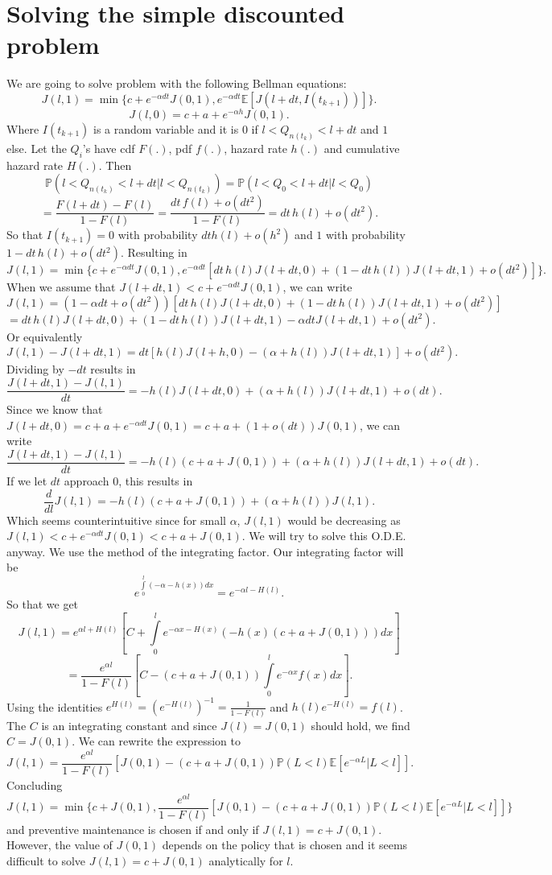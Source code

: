 

\section{Solving the simple discounted problem}
We are going to solve problem with the following Bellman equations:
$$
J(l,1)=\min\{
c+e^{-\alpha dt} J(0,1),
e^{-\alpha dt} \mathbb{E}[J(l+dt,I(t_{k+1}))]
\}.
$$
$$
J(l,0)=c + a + e^{-\alpha h} J(0,1).
$$
Where $I(t_{k+1})$ is a random variable and it is $0$ if $l<Q_{n(t_k)}<l+dt$ and $1$ else. Let the $Q_i$'s have cdf $F(.)$, pdf $f(.)$, hazard rate $h(.)$ and cumulative hazard rate $H(.)$. Then
$$
\mathbb{P}(l<Q_{n(t_k)}<l+dt|l<Q_{n(t_k)})=\mathbb{P}(l<Q_0<l+dt|l<Q_0)
$$
$$
=\frac{F(l+dt)-F(l)}{1-F(l)}=\frac{dt\,f(l)+o(dt^2)}{1-F(l)}=dt\,h(l)+o(dt^2).
$$
So that $I(t_{k+1})=0$ with probability $dth(l)+o(h^2)$ and $1$ with probability $1-dt\,h(l)+o(dt^2)$. Resulting in
$$
J(l,1)=\min\{
c+e^{-\alpha dt} J(0,1), 
e^{-\alpha dt} [dt\,h(l)J(l+dt,0) + (1-dt\,h(l))J(l+dt,1) +o(dt^2)]
\}.
$$
When we assume that $J(l+dt,1)<c+e^{-\alpha dt} J(0,1)$, we can write
$$
J(l,1)=
(1-\alpha dt +o(dt^2)) [dt\,h(l)J(l+dt,0) + (1-dt\,h(l))J(l+dt,1) +o(dt^2)]
$$
$$
=dt\,h(l)J(l+dt,0) + (1-dt\,h(l))J(l+dt,1) - \alpha dt J(l+dt,1) +o(dt^2)
.
$$
Or equivalently
$$
J(l,1)-J(l+dt,1)=
dt[h(l)J(l+h,0) - (\alpha +h(l))J(l+dt,1)] +o(dt^2)
.
$$
Dividing by $-dt$ results in
$$
\frac{J(l+dt,1)-J(l,1)}{dt}=
-h(l)J(l+dt,0) + (\alpha +h(l))J(l+dt,1) +o(dt)
.
$$
Since we know that $J(l+dt,0)=c + a + e^{-\alpha dt} J(0,1)=c+a+(1+o(dt))J(0,1)$, we can write
$$
\frac{J(l+dt,1)-J(l,1)}{dt}=
-h(l)(c+a+J(0,1)) + (\alpha +h(l))J(l+dt,1) +o(dt)
.
$$
If we let $dt$ approach $0$, this results in
$$
\frac{d}{dl}J(l,1)=
-h(l)(c+a+J(0,1)) + (\alpha +h(l))J(l,1)
.
$$
Which seems counterintuitive since for small $\alpha$, $J(l,1)$ would be decreasing as $J(l,1)<c+e^{-\alpha dt} J(0,1)<c+a+J(0,1)$.
We will try to solve this O.D.E. anyway.
We use the method of the integrating factor.
Our integrating factor will be
$$
e^{\int\limits_0^l (-\alpha - h(x))dx}=e^{-\alpha l -H(l)}.
$$
So that we get
$$
J(l,1)=e^{\alpha l +H(l)} [C + \int\limits_0^l e^{-\alpha x -H(x)}(-h(x)(c+a+J(0,1)))dx]
$$
$$
=\frac{e^{\alpha l}}{1-F(l)} [C - (c+a+J(0,1))\int\limits_0^l e^{-\alpha x}f(x)dx].
$$
Using the identities $e^{H(l)}=(e^{-H(l)})^{-1}=\frac{1}{1-F(l)}$ and $h(l)e^{-H(l)}=f(l)$.
The $C$ is an integrating constant and since $J(l)=J(0,1)$ should hold, we find $C=J(0,1)$.
We can rewrite the expression to
$$
J(l,1)=\frac{e^{\alpha l}}{1-F(l)} [J(0,1)  - (c+a+J(0,1))\mathbb{P}(L<l)\mathbb{E}[e^{-\alpha L}|L<l]].
$$
Concluding
$$
J(l,1)=\min\{
c+J(0,1),
\frac{ e^{\alpha l}}{1-F(l)} [J(0,1) - (c+a+J(0,1))\mathbb{P}(L<l)\mathbb{E}[e^{-\alpha L}|L<l]]
\}
$$
and preventive maintenance is chosen if and only if $J(l,1)=c+J(0,1)$.
However, the value of $J(0,1)$ depends on the policy that is chosen and it seems difficult to solve $J(l,1)=c+J(0,1)$ analytically for $l$.
